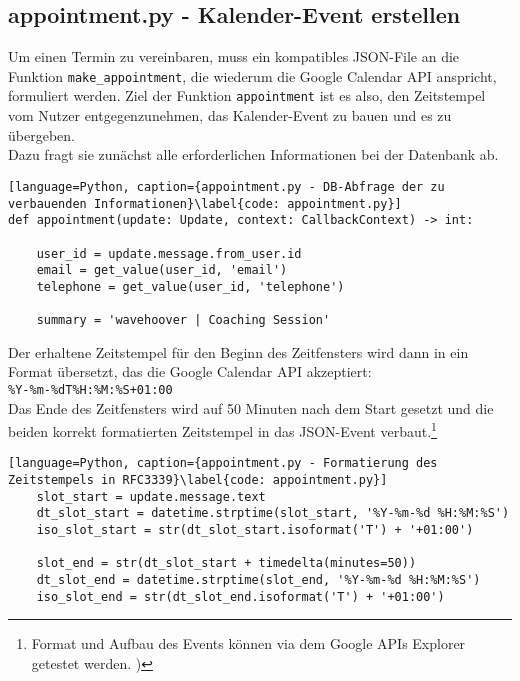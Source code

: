         \subsection{appointment.py - Kalender-Event erstellen} \label{Implementierung: appointment.py}
            Um einen Termin zu vereinbaren, muss ein kompatibles JSON-File an die Funktion \verb|make_appointment|, die wiederum die Google Calendar API anspricht, formuliert werden. Ziel der Funktion \verb|appointment| ist es also, den Zeitstempel vom Nutzer entgegenzunehmen, das Kalender-Event zu bauen und es zu übergeben. \\
            Dazu fragt sie zunächst alle erforderlichen Informationen bei der Datenbank ab. 

            \begin{lstlisting}[language=Python, caption={appointment.py - DB-Abfrage der zu verbauenden Informationen}\label{code: appointment.py}]
def appointment(update: Update, context: CallbackContext) -> int:

    user_id = update.message.from_user.id
    email = get_value(user_id, 'email')
    telephone = get_value(user_id, 'telephone')
    
    summary = 'wavehoover | Coaching Session'
            \end{lstlisting}
            
            Der erhaltene Zeitstempel für den Beginn des Zeitfensters wird dann in ein Format übersetzt, das die Google Calendar API akzeptiert: \\ 
            \verb/%Y-%m-%dT%H:%M:%S+01:00/ \\
            Das Ende des Zeitfensters wird auf 50 Minuten nach dem Start gesetzt und die beiden korrekt formatierten Zeitstempel in das JSON-Event verbaut.\footnote{Format und Aufbau des Events können via dem Google APIs Explorer getestet werden. \cite{apiExplorer})}

            \begin{lstlisting}[language=Python, caption={appointment.py - Formatierung des Zeitstempels in RFC3339}\label{code: appointment.py}]
    slot_start = update.message.text
    dt_slot_start = datetime.strptime(slot_start, '%Y-%m-%d %H:%M:%S')
    iso_slot_start = str(dt_slot_start.isoformat('T') + '+01:00')

    slot_end = str(dt_slot_start + timedelta(minutes=50))
    dt_slot_end = datetime.strptime(slot_end, '%Y-%m-%d %H:%M:%S')
    iso_slot_end = str(dt_slot_end.isoformat('T') + '+01:00')
            \end{lstlisting}

